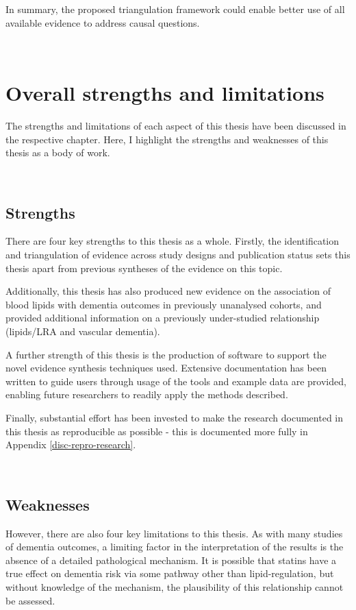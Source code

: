 \documentclass[a4paper, twoside]{templates/ociamthesis}
\begin{document}
In summary, the proposed triangulation framework could enable better use of all available evidence to address causal questions.

~

\hypertarget{overall-strengths-and-limitations}{%
\section{Overall strengths and limitations}\label{overall-strengths-and-limitations}}

The strengths and limitations of each aspect of this thesis have been discussed in the respective chapter. Here, I highlight the strengths and weaknesses of this thesis as a body of work.

~

\hypertarget{strengths-3}{%
\subsection{Strengths}\label{strengths-3}}

There are four key strengths to this thesis as a whole. Firstly, the identification and triangulation of evidence across study designs and publication status sets this thesis apart from previous syntheses of the evidence on this topic.

Additionally, this thesis has also produced new evidence on the association of blood lipids with dementia outcomes in previously unanalysed cohorts, and provided additional information on a previously under-studied relationship (lipids/LRA and vascular dementia).

A further strength of this thesis is the production of software to support the novel evidence synthesis techniques used. Extensive documentation has been written to guide users through usage of the tools and example data are provided, enabling future researchers to readily apply the methods described.

Finally, substantial effort has been invested to make the research documented in this thesis as reproducible as possible - this is documented more fully in Appendix \ref{disc-repro-research}.

~

\hypertarget{weaknesses}{%
\subsection{Weaknesses}\label{weaknesses}}

However, there are also four key limitations to this thesis. As with many studies of dementia outcomes, a limiting factor in the interpretation of the results is the absence of a detailed pathological mechanism. It is possible that statins have a true effect on dementia risk via some pathway other than lipid-regulation, but without knowledge of the mechanism, the plausibility of this relationship cannot be assessed.
\end{document}
